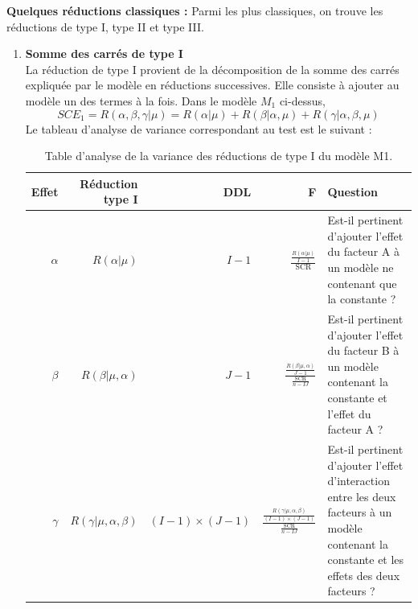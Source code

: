 \documentclass[12pt,a4paper]{article}
\begin{document}
	\textbf{Quelques réductions classiques :} 
	Parmi les plus classiques, on trouve les réductions de type I, type II et type III.
	
	\begin{enumerate}[label=\alph*)]
		\item \textbf{Somme des carrés de type I}\\
		La réduction de type I provient de la décomposition de la somme des carrés expliquée par le modèle en réductions successives. Elle consiste à ajouter au modèle un des termes à la fois. Dans le modèle $M_1$ ci-dessus,
		\begin{equation}
			SCE_1 = R(\alpha,\beta,\gamma|\mu) = R(\alpha|\mu) + R(\beta|\alpha,\mu) + R(\gamma|\alpha,\beta,\mu)
		\end{equation}
		Le tableau d'analyse de variance correspondant au test est le suivant : 
		\begin{table}[H]
			\centering
			\begin{tabular}{rrrrp{8cm}}
				\toprule
				\textbf{Effet} & \textbf{Réduction type I} & \textbf{DDL} & \textbf{F} & \textbf{Question} \\
				\midrule
				$\alpha$ & $R(\alpha|\mu)$ & $I-1$ & \LARGE{$\frac{\frac{R(\alpha|\mu)}{I-1}}{\text{SCR}}$} & Est-il pertinent d'ajouter l'effet du facteur A à un modèle ne contenant que la constante ? \\
				$\beta$ & $R(\beta|\mu, \alpha)$ & $J-1$ & \LARGE{$\frac{\frac{R(\beta|\mu, \alpha)}{J-1}}{\frac{\text{SCR}}{n-IJ}}$} & Est-il pertinent d'ajouter l'effet du facteur B à un modèle contenant la constante et l'effet du facteur A ? \\
				$\gamma$ & $R(\gamma|\mu, \alpha, \beta)$ & $(I-1) \times (J-1)$ & \LARGE{$\frac{\frac{R(\gamma|\mu, \alpha, \beta)}{(I-1) \times (J-1)}}{\frac{\text{SCR}}{n-IJ}}$} & Est-il pertinent d'ajouter l'effet d'interaction entre les deux facteurs à un modèle contenant la constante et les effets des deux facteurs ? \\
				\bottomrule
			\end{tabular}
			\caption{Table d'analyse de la variance des réductions de type I du modèle M1.}
		\end{table}
		

\end{enumerate}
\end{document}
